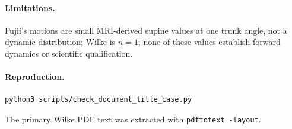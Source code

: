 \paragraph{Limitations.}
Fujii's motions are small MRI-derived supine values at one trunk angle, not
a dynamic distribution; Wilke is $n=1$; none of these values establish forward
dynamics or scientific qualification.

\paragraph{Reproduction.}
\begin{verbatim}
python3 scripts/check_document_title_case.py
\end{verbatim}
The primary Wilke PDF text was extracted with \texttt{pdftotext -layout}.
